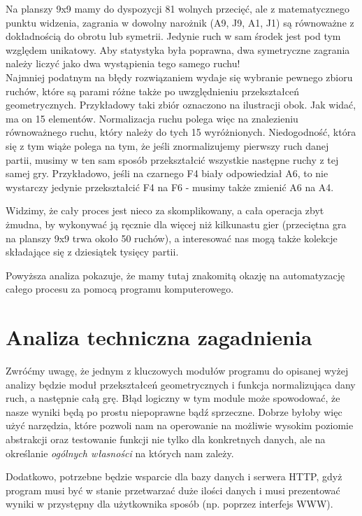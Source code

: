 \documentclass[11pt,leqno]{article}
\begin{document}
Na planszy 9x9 mamy do dyspozycji 81 wolnych przecięć, ale z matematycznego punktu widzenia, zagrania w dowolny narożnik 
(A9, J9, A1, J1) są równoważne z dokładnością do obrotu lub symetrii. Jedynie ruch w sam środek jest pod tym względem unikatowy. 
Aby statystyka była poprawna, dwa symetryczne zagrania należy liczyć jako dwa wystąpienia tego samego ruchu! \\ 
Najmniej podatnym  na błędy rozwiązaniem wydaje się wybranie pewnego zbioru ruchów, które są parami różne także po uwzględnieniu przekształceń 
geometrycznych. Przykładowy taki zbiór oznaczono na ilustracji obok. Jak widać, ma on 15 elementów. Normalizacja ruchu polega
 więc na znalezieniu równoważnego ruchu, który należy do tych 15 wyróżnionych. Niedogodność, która się z tym wiąże polega na 
tym, że jeśli znormalizujemy pierwszy ruch danej partii, musimy w ten sam sposób przekształcić wszystkie następne ruchy z tej samej gry. 
Przykładowo, jeśli na czarnego F4 biały odpowiedział A6, to nie wystarczy jedynie przekształcić
F4 na F6 - musimy także zmienić A6 na A4.

Widzimy, że cały proces jest nieco za skomplikowany, a cała operacja zbyt żmudna, by wykonywać ją ręcznie dla więcej niż 
kilkunastu gier (przeciętna gra na planszy 9x9 trwa około 50 ruchów), a interesować nas mogą także kolekcje składające się
z dziesiątek tysięcy partii.

Powyższa analiza pokazuje, że mamy tutaj znakomitą okazję na automatyzację całego procesu za pomocą programu komputerowego. 

\section{Analiza techniczna zagadnienia}

Zwróćmy uwagę, że jednym z kluczowych modułów programu do opisanej wyżej analizy będzie moduł przekształceń geometrycznych i
 funkcja normalizująca dany ruch, a następnie całą grę. Błąd logiczny w tym module może spowodować, że nasze wyniki będą po prostu 
niepoprawne bądź sprzeczne. Dobrze byłoby więc użyć narzędzia, które pozwoli nam na operowanie na możliwie wysokim poziomie
 abstrakcji oraz testowanie funkcji nie tylko dla konkretnych danych, ale na określanie \emph{ogólnych własności} na których nam zależy. 

Dodatkowo, potrzebne będzie wsparcie dla bazy danych i serwera HTTP, gdyż program musi być w stanie przetwarzać duże ilości danych
 i musi prezentować wyniki w przystępny dla użytkownika sposób (np. poprzez interfejs WWW).
\end{document}
